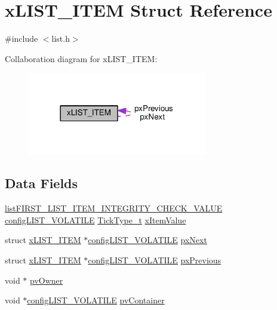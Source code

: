 \hypertarget{structxLIST__ITEM}{}\section{x\+L\+I\+S\+T\+\_\+\+I\+T\+EM Struct Reference}
\label{structxLIST__ITEM}


{\ttfamily \#include $<$list.\+h$>$}



Collaboration diagram for x\+L\+I\+S\+T\+\_\+\+I\+T\+EM\+:\nopagebreak
\begin{figure}[H]
\begin{center}
\leavevmode
\includegraphics[width=222pt]{d4/d5e/structxLIST__ITEM__coll__graph}
\end{center}
\end{figure}
\subsection*{Data Fields}
\begin{DoxyCompactItemize}
\item 
\hyperlink{list_8h_a3611bd5d5d87cb26ac1dc7a4852b94a0}{list\+F\+I\+R\+S\+T\+\_\+\+L\+I\+S\+T\+\_\+\+I\+T\+E\+M\+\_\+\+I\+N\+T\+E\+G\+R\+I\+T\+Y\+\_\+\+C\+H\+E\+C\+K\+\_\+\+V\+A\+L\+UE} \hyperlink{list_8h_a2d5de557c5561c8980d1bf51d87d8cba}{config\+L\+I\+S\+T\+\_\+\+V\+O\+L\+A\+T\+I\+LE} \hyperlink{portmacro_8h_aa69c48c6e902ce54f70886e6573c92a9}{Tick\+Type\+\_\+t} \hyperlink{structxLIST__ITEM_a9b1f26de79f9da1403ca3ebc7a2e653a}{x\+Item\+Value}
\item 
struct \hyperlink{structxLIST__ITEM}{x\+L\+I\+S\+T\+\_\+\+I\+T\+EM} $\ast$\hyperlink{list_8h_a2d5de557c5561c8980d1bf51d87d8cba}{config\+L\+I\+S\+T\+\_\+\+V\+O\+L\+A\+T\+I\+LE} \hyperlink{structxLIST__ITEM_a03713c4ee953ef5ca6adbec883720c60}{px\+Next}
\item 
struct \hyperlink{structxLIST__ITEM}{x\+L\+I\+S\+T\+\_\+\+I\+T\+EM} $\ast$\hyperlink{list_8h_a2d5de557c5561c8980d1bf51d87d8cba}{config\+L\+I\+S\+T\+\_\+\+V\+O\+L\+A\+T\+I\+LE} \hyperlink{structxLIST__ITEM_ae8e553eae41010a8e41c66d76c94110b}{px\+Previous}
\item 
void $\ast$ \hyperlink{structxLIST__ITEM_aeb3110b50fe0dbce826d929b27b5ddb1}{pv\+Owner}
\item 
void $\ast$\hyperlink{list_8h_a2d5de557c5561c8980d1bf51d87d8cba}{config\+L\+I\+S\+T\+\_\+\+V\+O\+L\+A\+T\+I\+LE} \hyperlink{structxLIST__ITEM_a341462d06236aa07eaf1a864e4b59951}{pv\+Container}
\end{DoxyCompactItemize}


